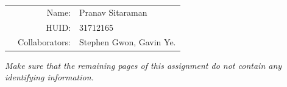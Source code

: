 \documentclass{article}
\begin{document}
\hwsubheader


%
%
%
\vspace{5cm}
{\LARGE
\begin{tabular}{rp{0.6\linewidth}}
  Name:&Pranav Sitaraman\\
  HUID:&31712165\\
  Collaborators:&{\normalsize
    Stephen Gwon, Gavin Ye.
    }
\end{tabular}
}

\vfill
\textit{Make sure that the remaining pages of this assignment do not contain any identifying information.}
\vfill

\newcommand{\bindop}{\mathbin{\mbox{\ttfamily >>=}}}
\newcommand{\sappend}{\mathbin{++}}
\newcommand{\emptyout}{\epsilon}


%
%
%


\newpage
\end{document}
